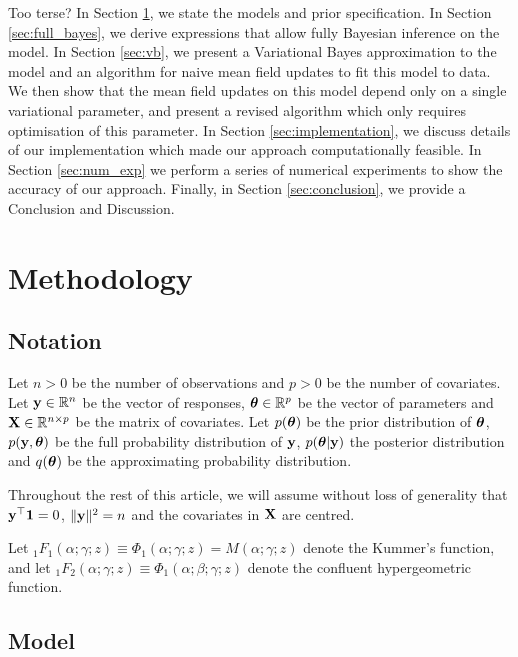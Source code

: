 \documentclass{amsart}[12pt]
\newcommand{\mgc}[1]{{\color{blue}#1}}
\begin{document}
\mgc{Too terse?}
In Section \ref{sec:methodology}, we state the models and prior specification.
In Section \ref{sec:full_bayes}, we derive expressions that allow fully Bayesian inference on the model.
In Section \ref{sec:vb}, we present a Variational Bayes approximation to the model and an algorithm for naive mean field updates to fit this model to data. We then show that the mean
field updates on this model depend only on a single variational parameter, and present a revised algorithm which
only requires optimisation of this parameter.
In Section \ref{sec:implementation}, we discuss details of our implementation which made our approach 
computationally feasible.
In Section \ref{sec:num_exp} we perform a series of numerical experiments to show the accuracy of our approach. Finally, in Section \ref{sec:conclusion}, we provide a Conclusion and Discussion.


\section{Methodology}
\label{sec:methodology}

\subsection{Notation}


Let $n > 0$ be the number of observations and $p > 0$ be the number of covariates. Let ${\bf y} \in {\mathbb{R}}^n$ be the
vector of responses, ${\boldsymbol \theta} \in {\mathbb{R}}^p$ be the vector of parameters and ${\bf X} \in {\mathbb{R}}^{n \times p}$ be the
matrix of covariates. Let $p({\boldsymbol \theta})$ be the prior distribution of ${\boldsymbol \theta}$, $p({\bf y}, {\boldsymbol \theta})$ be the full
probability distribution of ${\bf y}$, $p({\boldsymbol \theta} | {\bf y})$ the posterior distribution and $q({\boldsymbol \theta})$ be the
approximating probability distribution. 

Throughout the rest of this article, we will assume without loss of generality that
${\bf y}^\top{\bf1} = 0$, $\|{\bf y}\|^2 = n$ and the covariates in ${\bf X}$ are centred.

\noindent Let ${}_1 F_1(\alpha;\gamma;z) \equiv \Phi_1(\alpha;\gamma;z) = M(\alpha;\gamma;z)$ 
denote the Kummer's function,
and let ${}_1 F_2(\alpha;\gamma;z) \equiv \Phi_1(\alpha;\beta;\gamma;z)$ 
denote the confluent hypergeometric function.

\subsection{Model}
\label{sec:model}
\end{document}
